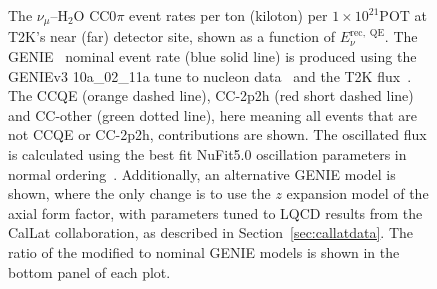 \documentclass{ar-1col}
\begin{document}
\begin{figure}[htbp]
  \centering
  \captionsetup[subfloat]{captionskip=-5pt}
  \hspace{75pt}
  \vspace{11pt}
  \caption{The $\nu_{\mu}$--H$_{2}$O CC0$\pi$ event rates per ton (kiloton) per $1\times10^{21}$POT at T2K's near (far) detector site, shown as a function of $E^{\mathrm{rec,\;QE}}_{\nu}$. The GENIE~\cite{Andreopoulos:2009rq, GENIE:2021npt} nominal event rate (blue solid line) is produced using the GENIEv3 10a\_02\_11a tune to nucleon data~\cite{GENIE:2021zuu} and the T2K flux~\cite{T2K:2012bge}. The CCQE (orange dashed line), CC-2p2h (red short dashed line) and CC-other (green dotted line), here meaning all events that are not CCQE or CC-2p2h, contributions are shown. The oscillated flux is calculated using the best fit NuFit5.0 oscillation parameters in normal ordering~\cite{Esteban:2020cvm, nufitweb}. Additionally, an alternative GENIE model is shown, where the only change is to use the $z$ expansion model of the axial form factor, with parameters tuned to LQCD results from the CalLat collaboration, as described in Section~\ref{sec:callatdata}. The ratio of the modified to nominal GENIE models is shown in the bottom panel of each plot.}
  \label{fig:t2k_impact}
\end{figure}
\end{document}
